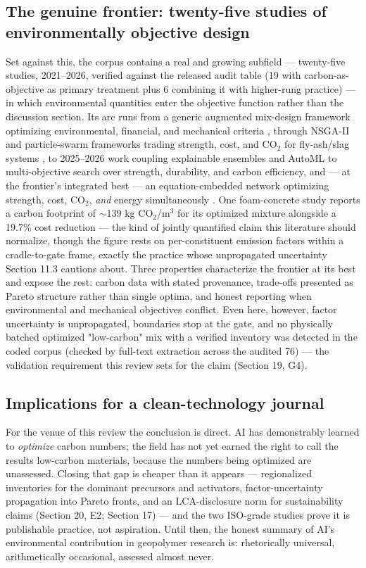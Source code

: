 \documentclass[pdflatex,sn-basic]{sn-jnl}
\begin{document}
\subsection{The genuine frontier: twenty-five studies of environmentally objective design}

Set against this, the corpus contains a real and growing subfield --- twenty-five studies, 2021--2026, verified against the released audit table (19 with carbon-as-objective as primary treatment plus 6 combining it with higher-rung practice) --- in which environmental quantities enter the objective function rather than the discussion section. Its arc runs from a generic augmented mix-design framework optimizing environmental, financial, and mechanical criteria \citep{shobeiri2022}, through NSGA-II and particle-swarm frameworks trading strength, cost, and CO$_2$ for fly-ash/slag systems \citep{huang2023}, to 2025--2026 work coupling explainable ensembles and AutoML to multi-objective search over strength, durability, and carbon efficiency, and --- at the frontier's integrated best --- an equation-embedded network optimizing strength, cost, CO$_2$, \emph{and} energy simultaneously \citep{guo2026}. One foam-concrete study reports a carbon footprint of $\sim$139 kg CO$_2$/m$^3$ for its optimized mixture alongside a 19.7\% cost reduction \citep{song2026} --- the kind of jointly quantified claim this literature should normalize, though the figure rests on per-constituent emission factors within a cradle-to-gate frame, exactly the practice whose unpropagated uncertainty Section 11.3 cautions about. Three properties characterize the frontier at its best and expose the rest: carbon data with stated provenance, trade-offs presented as Pareto structure rather than single optima, and honest reporting when environmental and mechanical objectives conflict. Even here, however, factor uncertainty is unpropagated, boundaries stop at the gate, and no physically batched optimized "low-carbon" mix with a verified inventory was detected in the coded corpus (checked by full-text extraction across the audited 76) --- the validation requirement this review sets for the claim (Section 19, G4).

\subsection{Implications for a clean-technology journal}

For the venue of this review the conclusion is direct. AI has demonstrably learned to \emph{optimize} carbon numbers; the field has not yet earned the right to call the results low-carbon materials, because the numbers being optimized are unassessed. Closing that gap is cheaper than it appears --- regionalized inventories for the dominant precursors and activators, factor-uncertainty propagation into Pareto fronts, and an LCA-disclosure norm for sustainability claims (Section 20, E2; Section 17) --- and the two ISO-grade studies prove it is publishable practice, not aspiration. Until then, the honest summary of AI's environmental contribution in geopolymer research is: rhetorically universal, arithmetically occasional, assessed almost never.
\end{document}
